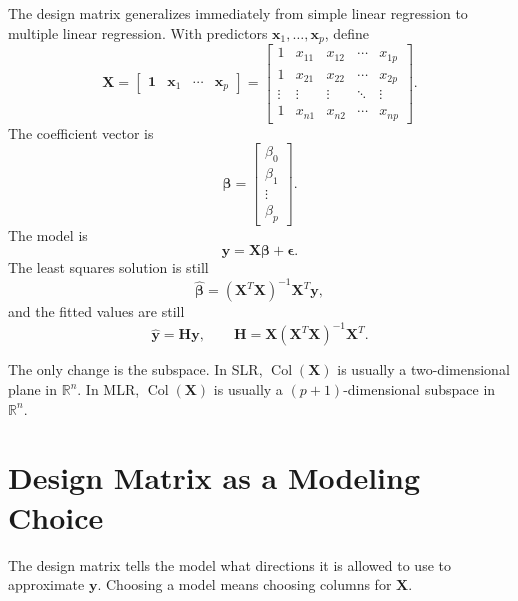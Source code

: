 The design matrix generalizes immediately from simple linear regression to multiple linear regression.  With predictors \(\mathbf{x}_1,\ldots,\mathbf{x}_p\), define
\begin{equation}
  \mathbf{X}=\begin{bmatrix}\mathbf{1}&\mathbf{x}_1&\cdots&\mathbf{x}_p\end{bmatrix}
  =
  \begin{bmatrix}
    1 & x_{11} & x_{12} & \cdots & x_{1p} \\
    1 & x_{21} & x_{22} & \cdots & x_{2p} \\
    \vdots & \vdots & \vdots & \ddots & \vdots \\
    1 & x_{n1} & x_{n2} & \cdots & x_{np}
  \end{bmatrix}.
\end{equation}
The coefficient vector is
\begin{equation}
  \boldsymbol{\beta}=\begin{bmatrix}
    \beta_0\\\beta_1\\\vdots\\\beta_p
  \end{bmatrix}.
\end{equation}
The model is
\begin{equation}
  \mathbf{y}=\mathbf{X}\boldsymbol{\beta}+\boldsymbol{\epsilon}.
\end{equation}
The least squares solution is still
\begin{equation}
  \widehat{\boldsymbol{\beta}}
  =(\mathbf{X}^T\mathbf{X})^{-1}\mathbf{X}^T\mathbf{y},
\end{equation}
and the fitted values are still
\begin{equation}
  \widehat{\mathbf{y}}=\mathbf{H}\mathbf{y},
  \qquad
  \mathbf{H}=\mathbf{X}(\mathbf{X}^T\mathbf{X})^{-1}\mathbf{X}^T.
\end{equation}

The only change is the subspace.  In SLR, \(\operatorname{Col}(\mathbf{X})\) is usually a two-dimensional plane in \(\mathbb{R}^n\).  In MLR, \(\operatorname{Col}(\mathbf{X})\) is usually a \((p+1)\)-dimensional subspace in \(\mathbb{R}^n\).

\section{Design Matrix as a Modeling Choice}

The design matrix tells the model what directions it is allowed to use to approximate \(\mathbf{y}\).  Choosing a model means choosing columns for \(\mathbf{X}\).

